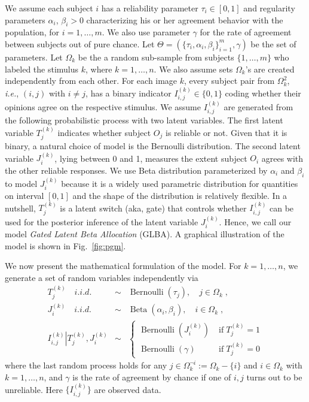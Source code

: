 \documentclass[10pt,journal,letterpaper,compsoc,twoside]{IEEEtran}
\newcommand{\assign}{:=}
\newcommand{\nocomma}{}
\newcommand{\tmop}[1]{\ensuremath{\operatorname{#1}}}
\begin{document}
We assume each subject $i$ has a reliability parameter $\tau_{i} \in [ 0,1 ]$
and regularity parameters $\alpha_{i}$, $\beta_{i} > 0$ characterizing his or her agreement
behavior with the population, for $i=1, \ldots ,m$. We also use parameter $\gamma$ for the rate of agreement between subjects out of pure chance. Let $\Theta = ( \{ \tau_{i} , \alpha_{i} ,
\beta_{i} \}_{i=1}^{m} , \gamma )$ be the set of {parameters}. Let $\Omega_{k}$
be the a random sub-sample from subjects $\{ 1, \ldots ,m \}$ who labeled the
stimulus $k$, where $k=1, \ldots ,n$. We also assume sets
$\Omega_{k}$'s are created independently from each other. For each image $k$, every subject
pair from $\Omega_{k}^{2}$, {\it i.e.}, $( i,j )$ with $i \neq j$, has a binary indicator
$I_{i,j}^{( k )} \in \{ 0,1 \}$ coding whether their opinions agree on the
respective stimulus. We assume $I_{i,j}^{( k )}$ are generated from the
following probabilistic process with two latent variables. The first latent variable $T_j^{(k)}$ indicates whether subject $O_j$ is reliable or not. Given that it is binary, a natural choice of model is the Bernoulli distribution.  The second latent variable $J_i^{(k)}$, lying between 0 and 1, measures the extent subject $O_i$ agrees with the other reliable responses. We use Beta distribution parameterized by $\alpha_i$ and $\beta_i$ to model $J_i^{(k)}$ because it is a widely used parametric distribution for quantities on interval $[0,1]$ and the shape of the distribution is relatively flexible. In a nutshell, $T_{j}^{( k )}$ is a latent switch (aka, gate) that controls whether $I_{i,j}^{( k )}$ can be used for the posterior inference
of the latent variable $J_{i}^{( k )}$. Hence, we call our model {\em Gated Latent Beta Allocation} (GLBA). A graphical illustration of the model is shown in Fig.~\ref{fig:pgm}. 

We now present the mathematical formulation of the model. 
For $k=1, \ldots ,n$, we generate 
a set of random variables independently via
\begin{eqnarray}
  T_{j}^{( k )}   \hspace{1em} i.i.d. & \sim & \tmop{Bernoulli} ( \tau_{j} )
  \nocomma , \hspace{1em} j \in \Omega_{k} \;,\\
  J_{i}^{( k )} \hspace{1em} i.i.d. & \sim & \tmop{Beta} ( \alpha_{i} ,
  \beta_{i} ) , \hspace{1em} i \in \Omega_{k} \;,\\ 
  I_{i,j}^{( k )} \left\lvert T_{j}^{(k)}, J_{i}^{(k)} \right. & \sim & \left\{\begin{array}{ll}
    \tmop{Bernoulli} \left( J_{i}^{( k )} \right) \nocomma & \tmop{if}  T_{j}^{( k )}
    =1\\
    \tmop{Bernoulli} ( \gamma ) & \tmop{if}  T_{j}^{( k )} =0
  \end{array}\right. \label{eq:Iijk}
\end{eqnarray}
where the last random process holds for any $j \in \Omega_{k}^{\neg i} \assign
\Omega_{k} - \{ i \}$ and $i \in \Omega_{k}$ with $k=1, \ldots ,n$, and
$\gamma$ is the rate of agreement by chance if one of $i,j$ turns out to be unreliable. 
Here $\{ I_{i,j}^{( k )} \}$ are observed data. 
\end{document}
